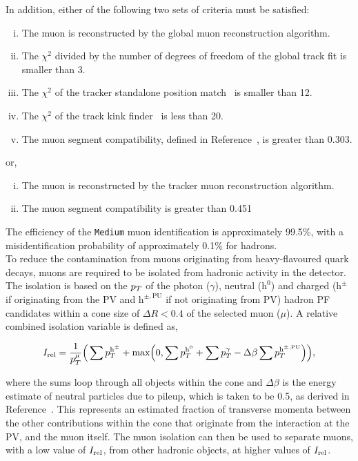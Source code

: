 In addition, either of the following two sets of criteria must be satisfied:

\begin{enumerate}[i)]
\item The muon is reconstructed by the global muon reconstruction algorithm.
\item The $\chi^2$ divided by the number of degrees of freedom of the global track fit is smaller than 3.
\item The $\chi^2$ of the tracker standalone position match~\cite{CMS:2009fdy} is smaller than 12.
\item The $\chi^2$ of the track kink finder~\cite{CMS:2018rym} is less than 20.
\item The muon segment compatibility, defined in Reference~\cite{CMS:2009fdy}, is greater than 0.303.
\end{enumerate}

or,

\begin{enumerate}[i)]
\item The muon is reconstructed by the tracker muon reconstruction algorithm.
\item The muon segment compatibility is greater than 0.451 
\end{enumerate}

The efficiency of the \texttt{Medium} muon identification is approximately 99.5\%, with a misidentification probability of approximately 0.1\% for hadrons. \\

To reduce the contamination from muons originating from heavy-flavoured quark decays, muons are required to be isolated from hadronic activity in the detector. 
The isolation is based on the $p_{T}$ of the photon ($\gamma$), neutral ($\text{h}^0$) and charged ($\text{h}^{\pm}$ if originating from the \ac{PV} and $\text{h}^{\pm,\text{PU}}$ if not originating from \ac{PV}) hadron \ac{PF} candidates within a cone size of $\Delta R<0.4$ of the selected muon ($\mu$). 
A relative combined isolation variable is defined as,

\begin{equation}
\label{eqn:reliso}
I_{\text{rel}} = \frac{1}{p_{T}^{\mu}} \Big( \sum p_{T}^{\text{h}^{\pm}} + \text{max}\Big( 0, \sum p_{T}^{\text{h}^0} + \sum p_{T}^{\gamma} - \Delta \beta \sum p_{T}^{\text{h}^{\pm, \text{PU}}} \Big) \Big),
\end{equation}

where the sums loop through all objects within the cone and $\Delta \beta$ is the energy estimate of neutral particles due to pileup, which is taken to be 0.5, as derived in Reference~\cite{CMS:2010eua}.
This represents an estimated fraction of transverse momenta between the other contributions within the cone that originate from the interaction at the \ac{PV}, and the muon itself.
The muon isolation can then be used to separate muons, with a low value of $I_{\text{rel}}$, from other hadronic objects, at higher values of $I_{\text{rel}}$.


